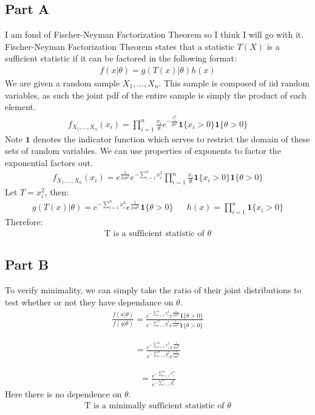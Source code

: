 \documentclass{article}
\begin{document}
\subsection*{Part A}
I am fond of Fischer-Neyman Factorization Theorem so I think I will go with it. Fischer-Neyman Factorization Theorem states that a statistic $T(X)$ is a sufficient statistic if it can be factored in the following format:
\begin{align*}
f(x|\theta) = g(T(x)|\theta)h(x)
\end{align*}
We are given a random sample $X_1,...,X_n$. This sample is composed of iid random variables, as such the joint pdf of the entire sample is simply the product of each element.
\begin{align*}
f_{X_1,...,X_n}(x_i) = \prod_{i=1}^{n} \frac{x_i}{\theta} e^{-\tfrac{x^2_i}{2\theta^2}} \mathbf{1}\{x_i>0\} \mathbf{1}\{\theta > 0\}
\end{align*}
Note $\mathbf{1}$ denotes the indicator function which serves to restrict the domain of these sets of random variables. We can use properties of exponents to factor the exponential factors out.
\begin{align*}
f_{X_1,...,X_n}(x_i) = e^{\tfrac{1}{2 n \theta^2}} e^{-\sum_{i=1}^{n} x^2_i} \prod_{i=1}^{n} \frac{x_i}{\theta} \mathbf{1}\{x_i>0\} \mathbf{1}\{\theta > 0\}
\end{align*}
Let $T = x^2_i$, then:
\begin{align*}
g(T(x)|\theta) = e^{-\sum_{i=1}^{n} x^2_i} e^{\tfrac{1}{2 n \theta^2}} \mathbf{1}\{\theta > 0\} && h(x) = \prod_{i=1}^{n} \mathbf{1}\{x_i>0\}
\end{align*}
Therefore:
\begin{align*}
\boxed{ \text{T is a sufficient statistic of } \theta }
\end{align*}

\subsection*{Part B}
To verify minimality, we can simply take the ratio of their joint distributions to test whether or not they have dependance on $\theta$.
\begin{align*}
\frac{f(x|\theta)}{f(y|\theta)} = \frac{e^{-\sum_{i=1}^{n} x^2_i} e^{\tfrac{1}{2 n \theta^2}} \mathbf{1}\{\theta > 0\}}{e^{-\sum_{i=1}^{n} y^2_i} e^{\tfrac{1}{2 n \theta^2}} \mathbf{1}\{\theta > 0\}}
\end{align*}

\begin{align*}
= \frac{e^{-\sum_{i=1}^{n} x^2_i} e^{\tfrac{1}{2 n \theta^2}}}{e^{-\sum_{i=1}^{n} y^2_i} e^{\tfrac{1}{2 n \theta^2}}}
\end{align*}

\begin{align*}
= \frac{e^{-\sum_{i=1}^{n} x^2_i} }{e^{-\sum_{i=1}^{n} y^2_i}}
\end{align*}
Here there is no dependence on $\theta$.
\begin{align*}
\boxed{ \text{T is a minimally sufficient statistic of } \theta }
\end{align*}
\end{document}
